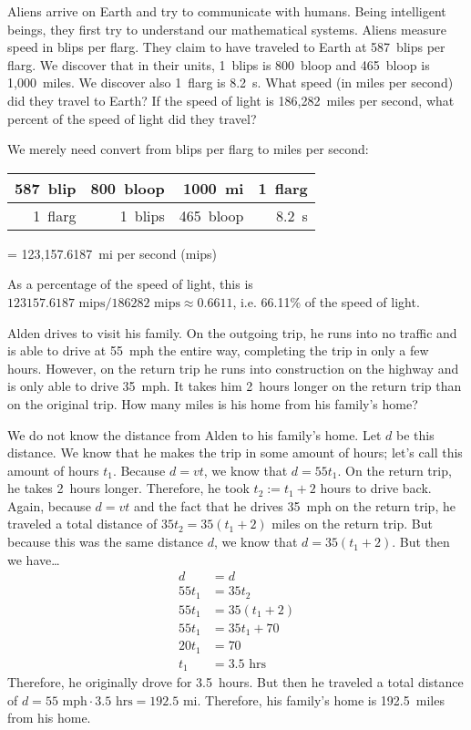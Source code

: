 \documentclass[11pt,letterpaper]{article}
\begin{document}
\newpage



 Aliens arrive on Earth and try to communicate with humans. Being intelligent beings, they first try to understand our mathematical systems. Aliens measure speed in blips per flarg. They claim to have traveled to Earth at 587~blips per flarg. We discover that in their units, 1~blips is 800~bloop and 465~bloop is 1,000~miles. We discover also 1~flarg is 8.2~s. What speed (in miles per second) did they travel to Earth? If the speed of light is 186,282~miles per second, what percent of the speed of light did they travel? \pspace

\sol We merely need convert from blips per flarg to miles per second: \par
	\begin{table}[!ht]
	\centering
	\begin{tabular}{r|r|r|r}
	587~blip   & 800~bloop & 1000~mi    & 1~flarg \\ \hline
	1~flarg	& 1~blips      & 465~bloop & 8.2~s
	\end{tabular}
	= 123,157.6187~mi per second (mips)
	\end{table} 
As a percentage of the speed of light, this is $123157.6187 \text{ mips}/186282 \text{ mips} \approx 0.6611$, i.e. 66.11\% of the speed of light. 



\newpage



 Alden drives to visit his family. On the outgoing trip, he runs into no traffic and is able to drive at 55~mph the entire way, completing the trip in only a few hours. However, on the return trip he runs into construction on the highway and is only able to drive 35~mph. It takes him 2~hours longer on the return trip than on the original trip. How many miles is his home from his family's home? \pspace

\sol We do not know the distance from Alden to his family's home. Let $d$ be this distance. We know that he makes the trip in some amount of hours; let's call this amount of hours $t_1$. Because $d= vt$, we know that $d= 55t_1$. On the return trip, he takes 2~hours longer. Therefore, he took $t_2:= t_1 + 2$ hours to drive back. Again, because $d= vt$ and the fact that he drives 35~mph on the return trip, he traveled a total distance of $35t_2= 35(t_1 + 2)$ miles on the return trip. But because this was the same distance $d$, we know that $d= 35(t_1 + 2)$. But then we have\dots
	\[
	\begin{aligned}
	d&= d \\[0.3cm]
	55t_1&= 35t_2 \\[0.3cm]
	55t_1&= 35(t_1 + 2) \\[0.3cm]
	55t_1&= 35t_1 + 70 \\[0.3cm]
	20t_1&= 70 \\[0.3cm]
	t_1&= 3.5 \text{ hrs}
	\end{aligned}
	\]
Therefore, he originally drove for 3.5~hours. But then he traveled a total distance of $d= 55 \text{ mph} \cdot 3.5 \text{ hrs}= 192.5 \text{ mi}$. Therefore, his family's home is 192.5~miles from his home. 
\end{document}
